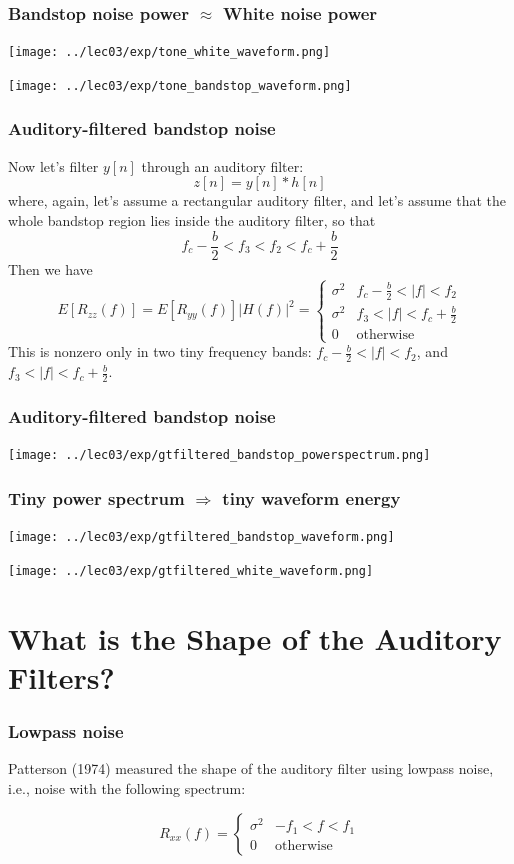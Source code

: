 \documentclass{beamer}
\begin{document}
\begin{frame}
  \frametitle{Bandstop noise power $\approx$ White noise power}

  \centerline{\texttt{[image: ../lec03/exp/tone\_white\_waveform.png]}}
  \centerline{\texttt{[image: ../lec03/exp/tone\_bandstop\_waveform.png]}}
\end{frame}

\begin{frame}
  \frametitle{Auditory-filtered bandstop noise}

  Now let's filter $y[n]$ through an auditory filter:
  \[
  z[n] = y[n]\ast h[n]
  \]
  where, again, let's assume a rectangular auditory filter, and let's assume that the
  whole bandstop region lies inside the auditory filter, so that
  \[
  f_c-\frac{b}{2} < f_3 < f_2 < f_c+\frac{b}{2}
  \]
  Then we have
  \[
  E\left[R_{zz}(f)\right] = E\left[R_{yy}(f)\right]|H(f)|^2 = \begin{cases}
    \sigma^2 & f_c-\frac{b}{2} < |f| < f_2\\
    \sigma^2 & f_3 < |f| < f_c+\frac{b}{2} \\
    0 & \mbox{otherwise}
  \end{cases}
  \]
  This is nonzero only in two tiny frequency bands:  $f_c-\frac{b}{2} < |f| < f_2$, and
  $f_3 < |f| < f_c+\frac{b}{2}$.
\end{frame}

\begin{frame}
  \frametitle{Auditory-filtered bandstop noise}

  \centerline{\texttt{[image: ../lec03/exp/gtfiltered\_bandstop\_powerspectrum.png]}}
\end{frame}

\begin{frame}
  \frametitle{Tiny power spectrum $\Rightarrow$ tiny waveform energy}

  \centerline{\texttt{[image: ../lec03/exp/gtfiltered\_bandstop\_waveform.png]}}
  \centerline{\texttt{[image: ../lec03/exp/gtfiltered\_white\_waveform.png]}}
\end{frame}

\section[Shape]{What is the Shape of the Auditory Filters?}
\setcounter{subsection}{1}

\begin{frame}
  \frametitle{Lowpass noise}

  Patterson (1974) measured the shape of the auditory filter using
  lowpass noise, i.e., noise with the following spectrum:

  \[
  R_{xx}(f)  =\begin{cases}
  \sigma^2 & -f_1 < f<f_1\\ 0&\mbox{otherwise}
  \end{cases}
  \]
\end{frame}
  
\end{document}
